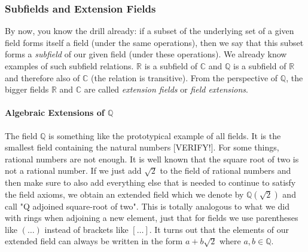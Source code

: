 

\subsubsection{Subfields and Extension Fields}
By now, you know the drill already: if a subset of the underlying set of a given field forms itself a field (under the same operations), then we say that this subset forms a \emph{subfield} of our given field (under these operations). We already know examples of such subfield relations. $\mathbb{R}$ is a subfield of $\mathbb{C}$ and $\mathbb{Q}$ is a subfield of $\mathbb{R}$ and therefore also of $\mathbb{C}$ (the relation is transitive). From the perspective of $\mathbb{Q}$, the bigger fields $\mathbb{R}$ and $\mathbb{C}$ are called \emph{extension fields} or \emph{field extensions}. 





\paragraph{Algebraic Extensions of $\mathbb{Q}$}
The field $\mathbb{Q}$ is something like the prototypical example of all fields. It is the smallest field containing the natural numbers [VERIFY!]. For some things, rational numbers are not enough. It is well known that the square root of two is not a rational number. If we just add $\sqrt{2}$ to the field of rational numbers and then make sure to also add everything else that is needed to continue to satisfy the field axioms, we obtain an extended field which we denote by $\mathbb{Q}(\sqrt{2})$ and call "Q adjoined square-root of two". This is totally analogous to what we did with rings when adjoining a new element, just that for fields we use parentheses like $(\ldots)$ instead of brackets like $[\ldots]$. It turns out that the elements of our extended field can always be written in the form $a + b \sqrt{2}$ where $a,b \in \mathbb{Q}$.

